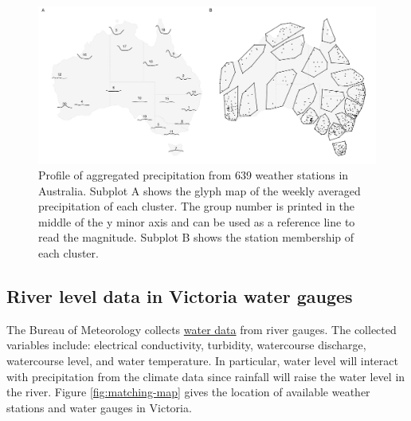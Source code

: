 \documentclass[
]{jss}
\begin{document}
\begin{CodeChunk}
\begin{figure}

{\centering \includegraphics[width=1\linewidth]{../figures/basic-agg} 

}

\caption[Profile of aggregated precipitation from 639 weather stations in Australia]{Profile of aggregated precipitation from 639 weather stations in Australia. Subplot A shows the glyph map of the weekly averaged precipitation of each cluster. The group number is printed in the middle of the y minor axis and can be used as a reference line to read the magnitude. Subplot B shows the station membership of each cluster.}\label{fig:basic-agg}
\end{figure}
\end{CodeChunk}

\hypertarget{river-level-data-in-victoria-water-gauges}{%
\subsection{River level data in Victoria water gauges}\label{river-level-data-in-victoria-water-gauges}}

The Bureau of Meteorology collects \href{http://www.bom.gov.au/metadata/catalogue/19115/ANZCW0503900528?template=full}{water data} from river gauges. The collected variables include: electrical conductivity, turbidity, watercourse discharge, watercourse level, and water temperature. In particular, water level will interact with precipitation from the climate data since rainfall will raise the water level in the river. Figure \ref{fig:matching-map} gives the location of available weather stations and water gauges in Victoria.
\end{document}
